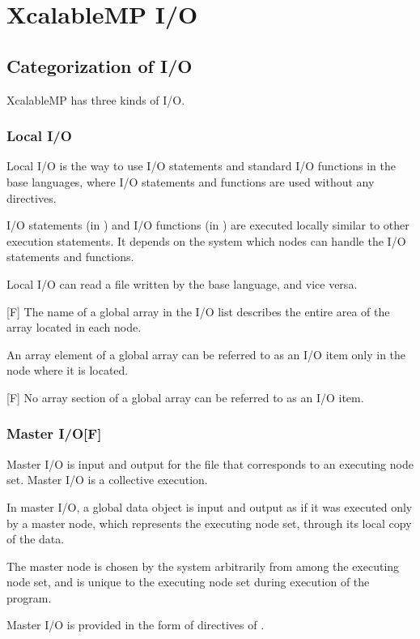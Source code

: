
 \chapter{XcalableMP I/O}

 \section{Categorization of I/O}
 XcalableMP has three kinds of I/O.

  \subsection{Local I/O}

  Local I/O is the way to use I/O statements and standard I/O functions in the
  base languages, where I/O statements and functions are used without
  any directives.

  I/O statements (in {\XMP} {\Fort}) and I/O functions (in {\XMP} {\C})
  are executed locally similar to other execution statements.
  It depends on the system which nodes can handle the I/O statements and
  functions.

  Local I/O can read a file written by the base language, and vice
  versa.

  [F] The name of a global array in the I/O list describes the
  entire area of the array located in each node.

  An array element of a global array can be referred to as an I/O item only
  in the node where it is located.

  [F] No array section of a global array can be referred to as an
  I/O item.

  \subsection{Master I/O[F]}

  Master I/O is input and output for the file that corresponds to an
  executing node set.
  Master I/O is a collective execution.

  In master I/O, a global data object is input and output as if it was executed
  only by a master node, which represents the executing node set, through
  its local copy of the data.

  The master node is chosen by the system arbitrarily from among the
  executing node set, and is unique to the executing node set during
  execution of the program.

  Master I/O is provided in the form of directives of {\XMP} {\Fort}.


